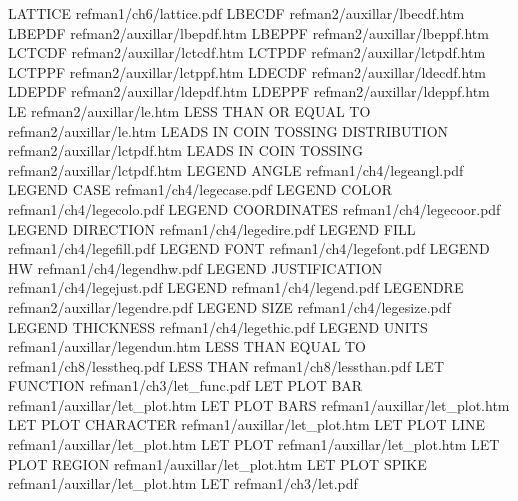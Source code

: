 LATTICE                                 refman1/ch6/lattice.pdf
LBECDF                                  refman2/auxillar/lbecdf.htm
LBEPDF                                  refman2/auxillar/lbepdf.htm
LBEPPF                                  refman2/auxillar/lbeppf.htm
LCTCDF                                  refman2/auxillar/lctcdf.htm
LCTPDF                                  refman2/auxillar/lctpdf.htm
LCTPPF                                  refman2/auxillar/lctppf.htm
LDECDF                                  refman2/auxillar/ldecdf.htm
LDEPDF                                  refman2/auxillar/ldepdf.htm
LDEPPF                                  refman2/auxillar/ldeppf.htm
LE                                      refman2/auxillar/le.htm
LESS THAN OR EQUAL TO                   refman2/auxillar/le.htm
LEADS IN COIN TOSSING DISTRIBUTION      refman2/auxillar/lctpdf.htm
LEADS IN COIN TOSSING                   refman2/auxillar/lctpdf.htm
LEGEND ANGLE                            refman1/ch4/legeangl.pdf
LEGEND CASE                             refman1/ch4/legecase.pdf
LEGEND COLOR                            refman1/ch4/legecolo.pdf
LEGEND COORDINATES                      refman1/ch4/legecoor.pdf
LEGEND DIRECTION                        refman1/ch4/legedire.pdf
LEGEND FILL                             refman1/ch4/legefill.pdf
LEGEND FONT                             refman1/ch4/legefont.pdf
LEGEND HW                               refman1/ch4/legendhw.pdf
LEGEND JUSTIFICATION                    refman1/ch4/legejust.pdf
LEGEND                                  refman1/ch4/legend.pdf
LEGENDRE                                refman2/auxillar/legendre.pdf
LEGEND SIZE                             refman1/ch4/legesize.pdf
LEGEND THICKNESS                        refman1/ch4/legethic.pdf
LEGEND UNITS                            refman1/auxillar/legendun.htm
LESS THAN EQUAL TO                      refman1/ch8/lesstheq.pdf
LESS THAN                               refman1/ch8/lessthan.pdf
LET FUNCTION                            refman1/ch3/let_func.pdf
LET PLOT BAR                            refman1/auxillar/let_plot.htm
LET PLOT BARS                           refman1/auxillar/let_plot.htm
LET PLOT CHARACTER                      refman1/auxillar/let_plot.htm
LET PLOT LINE                           refman1/auxillar/let_plot.htm
LET PLOT                                refman1/auxillar/let_plot.htm
LET PLOT REGION                         refman1/auxillar/let_plot.htm
LET PLOT SPIKE                          refman1/auxillar/let_plot.htm
LET                                     refman1/ch3/let.pdf
